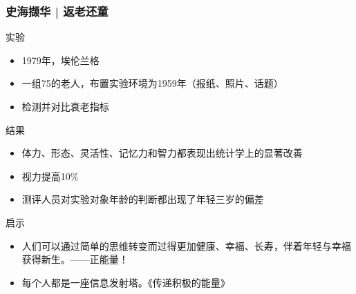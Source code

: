 \begin{frame}
  \frametitle{史海撷华 | 返老还童}
  \begin{block}{实验}
    \begin{itemize}
      \item 1979年，埃伦\textbullet 兰格
      \item 一组75的老人，布置实验环境为1959年（报纸、照片、话题）
      \item 检测并对比衰老指标
    \end{itemize}
  \end{block}
  \vspace{-0.3em}
  \pause
  \begin{block}{结果}
    \begin{itemize}
      \item 体力、形态、灵活性、记忆力和智力都表现出统计学上的显著改善
      \item 视力提高10\%
      \item 测评人员对实验对象年龄的判断都出现了年轻三岁的偏差
    \end{itemize}
  \end{block}
  \vspace{-0.3em}
  \pause
  \begin{block}{启示}
    \begin{itemize}
      \item 人们可以通过简单的思维转变而过得更加健康、幸福、长寿，伴着年轻与幸福获得新生。——正能量！
      \item 每个人都是一座信息发射塔。《传递积极的能量》
    \end{itemize}
  \end{block}
\end{frame}

